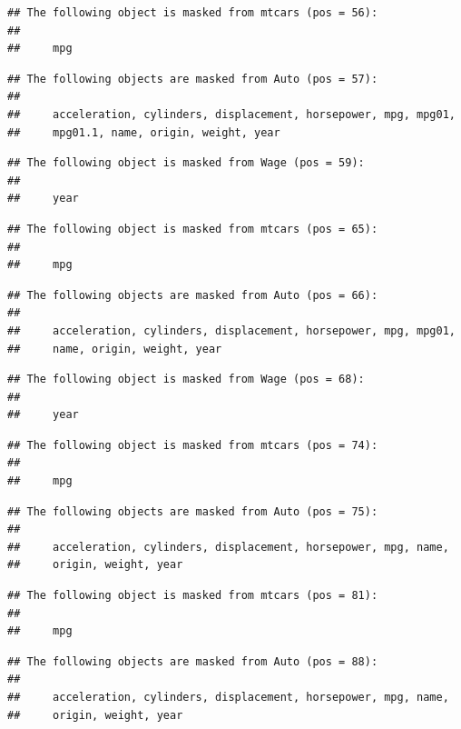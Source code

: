 \documentclass[]{book}
\begin{document}
\begin{verbatim}
## The following object is masked from mtcars (pos = 56):
## 
##     mpg
\end{verbatim}

\begin{verbatim}
## The following objects are masked from Auto (pos = 57):
## 
##     acceleration, cylinders, displacement, horsepower, mpg, mpg01,
##     mpg01.1, name, origin, weight, year
\end{verbatim}

\begin{verbatim}
## The following object is masked from Wage (pos = 59):
## 
##     year
\end{verbatim}

\begin{verbatim}
## The following object is masked from mtcars (pos = 65):
## 
##     mpg
\end{verbatim}

\begin{verbatim}
## The following objects are masked from Auto (pos = 66):
## 
##     acceleration, cylinders, displacement, horsepower, mpg, mpg01,
##     name, origin, weight, year
\end{verbatim}

\begin{verbatim}
## The following object is masked from Wage (pos = 68):
## 
##     year
\end{verbatim}

\begin{verbatim}
## The following object is masked from mtcars (pos = 74):
## 
##     mpg
\end{verbatim}

\begin{verbatim}
## The following objects are masked from Auto (pos = 75):
## 
##     acceleration, cylinders, displacement, horsepower, mpg, name,
##     origin, weight, year
\end{verbatim}

\begin{verbatim}
## The following object is masked from mtcars (pos = 81):
## 
##     mpg
\end{verbatim}

\begin{verbatim}
## The following objects are masked from Auto (pos = 88):
## 
##     acceleration, cylinders, displacement, horsepower, mpg, name,
##     origin, weight, year
\end{verbatim}
\end{document}
